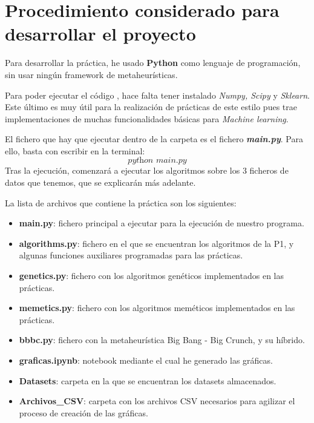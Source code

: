 \documentclass[10pt, a4paper]{article}
\theoremstyle{theorem-style}
\theoremstyle{theorem-style}
\theoremstyle{theorem2-style}
\theoremstyle{definition-style}
\theoremstyle{remark-style}
\theoremstyle{example-style}
\theoremstyle{definition-style}
\theoremstyle{remark-style}
\theoremstyle{remark-style}
\begin{document}
\newpage
\section{Procedimiento considerado para desarrollar el proyecto}
Para desarrollar la práctica, he usado \textbf{Python} como lenguaje de programación, sin usar ningún framework de metaheurísticas.

Para poder ejecutar el código , hace falta tener instalado \emph{Numpy, Scipy} y \emph{Sklearn}. Este último es muy útil para la realización de prácticas de este estilo pues trae implementaciones de muchas funcionalidades básicas para \emph{Machine learning}.

El fichero que hay que ejecutar dentro de la carpeta es el fichero \emph{\textbf{main.py}}. Para ello, basta con escribir en la terminal:
\[
\textit{python main.py}
\]
Tras la ejecución, comenzará a ejecutar los algoritmos sobre los 3 ficheros de datos que tenemos, que se explicarán más adelante.

La lista de archivos que contiene la práctica son los siguientes:
\begin{itemize}
	\item \textbf{main.py}: fichero principal a ejecutar para la ejecución de nuestro programa.	
	\item \textbf{algorithms.py}: fichero en el que se encuentran los algoritmos de la P1, y algunas funciones auxiliares programadas para las prácticas.

\item \textbf{genetics.py}: fichero con los algoritmos genéticos implementados en las prácticas.
\item \textbf{memetics.py}: fichero con los algoritmos meméticos implementados en las prácticas.

\item \textcolor{ugrColor}{\textbf{bbbc.py}: fichero con la metaheurística Big Bang - Big Crunch, y su híbrido.}
 
	\item \textbf{graficas.ipynb}: notebook mediante el cual he generado las gráficas.  
	\item \textbf{Datasets}: carpeta en la que se encuentran los datasets almacenados.
	\item \textbf{Archivos\_CSV}: carpeta con los archivos CSV necesarios para agilizar el proceso de creación de las gráficas.
	
\end{itemize}
\newpage
\end{document}
